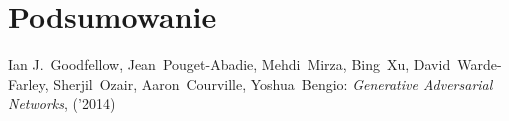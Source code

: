 \documentclass[10pt]{article}
\begin{document}
\section{Podsumowanie}


\newpage
\begin{thebibliography}{99} %
   Ian J.~Goodfellow, Jean~Pouget-Abadie, Mehdi~Mirza, Bing~Xu, David~Warde-Farley, Sherjil~Ozair, Aaron~Courville, Yoshua~Bengio:
  \emph{Generative Adversarial Networks}, ('2014)
\end{thebibliography}


\end{document}
